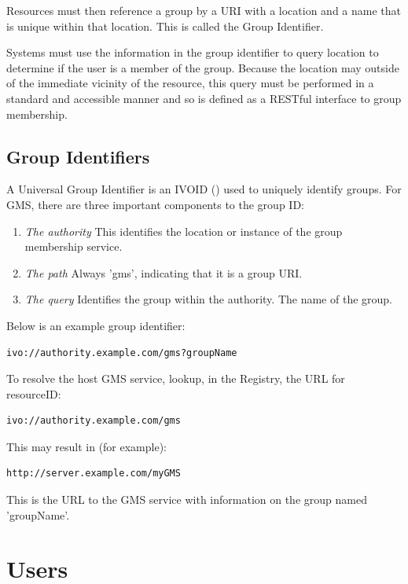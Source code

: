 \documentclass[11pt,a4paper]{ivoa}
\begin{document}
Resources must then reference a group by a URI with a location and a name that is unique within that location.  This is called the Group Identifier.

Systems must use the information in the group identifier to query location to determine if the user is a member of the group.  Because the location may outside of the immediate vicinity of the resource, this query must be performed in a standard and accessible manner and so is defined as a RESTful interface to group membership. 

\subsection{Group Identifiers}

A Universal Group Identifier is an IVOID (\citep{std:VOID2}) used to uniquely identify groups.  For GMS, there are three important components to the group ID:

\begin{enumerate}
\item \emph{The authority} This identifies the location or instance of the group membership service.
\item \emph{The path} Always 'gms', indicating that it is a group URI.
\item \emph{The query} Identifies the group within the authority.  The name of the group.
\end{enumerate}

Below is an example group identifier:

\begin{verbatim}
ivo://authority.example.com/gms?groupName
\end{verbatim}

To resolve the host GMS service, lookup, in the Registry, the URL for resourceID:

\begin{verbatim}
ivo://authority.example.com/gms
\end{verbatim}

This may result in (for example):

\begin{verbatim}
http://server.example.com/myGMS
\end{verbatim}

This is the URL to the GMS service with information on the group named 'groupName'.



\section{Users}
\end{document}
